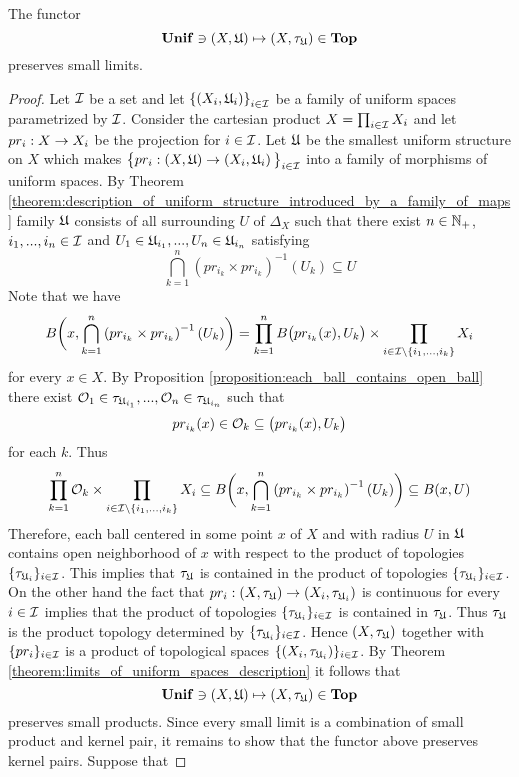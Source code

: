 \begin{theorem}\label{theorem:limits_of_uniform_spaces_description}
The functor 
$$\mathbf{Unif} \ni (X,{\mathfrak U}) \mapsto (X,\tau_{{\mathfrak U}}) \in \mathbf{Top}$$
preserves small limits.
\end{theorem}
\begin{proof}
Let ${\mathcal I}$ be a set and let $\left\{\left(X_i,{\mathfrak U}_i\right)\right\}_{i\in {\mathcal I}}$ be a family of uniform spaces parametrized by ${\mathcal I}$. Consider the cartesian product $X = \prod_{i\in {\mathcal I}}X_i$ and let $pr_i:X\rightarrow X_i$ be the projection for $i\in {\mathcal I}$. Let ${\mathfrak U}$ be the smallest uniform structure on $X$ which makes $\big\{pr_i:\left(X,{\mathfrak U}\right) \rightarrow \left(X_i,{\mathfrak U}_i\right)\big\}_{i\in {\mathcal I}}$ into a family of morphisms of uniform spaces. By Theorem \ref{theorem:description_of_uniform_structure_introduced_by_a_family_of_maps} family ${\mathfrak U}$ consists of all surrounding $U$ of $\Delta_X$ such that there exist $n\in {\mathbb N}_+$, $i_1,...,i_n\in {\mathcal I}$ and $U_1 \in {\mathfrak U}_{i_1},...,U_n\in {\mathfrak U}_{i_n}$ satisfying
$$\bigcap_{k=1}^n\left(pr_{i_k}\times pr_{i_k}\right)^{-1}(U_k) \subseteq U$$
Note that we have
$$B\bigg(x, \bigcap_{k=1}^n\left(pr_{i_k}\times pr_{i_k}\right)^{-1}(U_k)\bigg) = \prod_{k=1}^nB\big(pr_{i_k}(x), U_k\big)\times \prod_{i\in {\mathcal I}\setminus \{i_1,...,i_k\}}X_i$$
for every $x \in X$. By Proposition \ref{proposition:each_ball_contains_open_ball} there exist ${\mathcal O}_1 \in \tau_{{\mathfrak U}_{i_1}},...,{\mathcal O}_n \in \tau_{{\mathfrak U}_{i_n}}$ such that 
$$pr_{i_k}(x) \in {\mathcal O}_k \subseteq \big(pr_{i_k}(x), U_k\big)$$
for each $k$. Thus
$$\prod_{k=1}^n{\mathcal O}_k \times \prod_{i\in {\mathcal I}\setminus \{i_1,...,i_k\}}X_i \subseteq B\bigg(x, \bigcap_{k=1}^n\left(pr_{i_k}\times pr_{i_k}\right)^{-1}(U_k)\bigg) \subseteq B(x,U)$$
Therefore, each ball centered in some point $x$ of $X$ and with radius $U$ in ${\mathfrak U}$ contains open neighborhood of $x$ with respect to the product of topologies $\{\tau_{{\mathfrak U}_i}\}_{i\in  {\mathcal I}}$. This implies that $\tau_{{\mathfrak U}}$ is contained in the product of topologies $\{\tau_{{\mathfrak U}_i}\}_{i\in  {\mathcal I}}$. On the other hand the fact that $pr_i:(X,\tau_{{\mathfrak U}}) \rightarrow (X_i,\tau_{{\mathfrak U}_i})$ is continuous for every $i\in {\mathcal I}$ implies that the product of topologies $\{\tau_{{\mathfrak U}_i}\}_{i\in {\mathcal I}}$ is contained in $\tau_{{\mathfrak U}}$. Thus $\tau_{{\mathfrak U}}$ is the product topology determined by $\{\tau_{{\mathfrak U}_i}\}_{i\in {\mathcal I}}$. Hence $(X,\tau_{{\mathfrak U}})$ together with $\{pr_i\}_{i\in {\mathcal I}}$ is a product of topological spaces $\{(X_i,\tau_{{\mathfrak U}_i})\}_{i\in {\mathcal I}}$. By Theorem \ref{theorem:limits_of_uniform_spaces_description} it follows that
$$\mathbf{Unif} \ni (X,{\mathfrak U}) \mapsto (X,\tau_{{\mathfrak U}}) \in \mathbf{Top}$$
preserves small products. Since every small limit is a combination of small product and kernel pair, it remains to show that the functor above preserves kernel pairs. Suppose that 

\end{proof}
